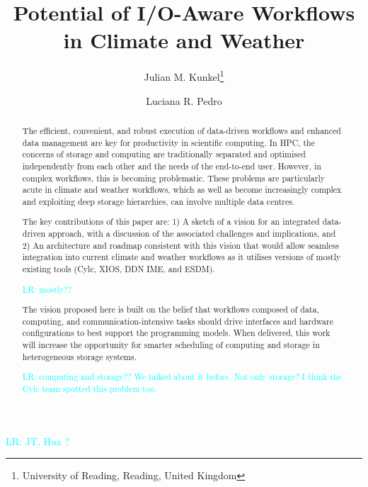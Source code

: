 \documentclass{superfri}
\newcommand{\lr}[1]{\textcolor{cyan}{LR: #1}}
\begin{document}
\author{Julian M. Kunkel\footnote{\label{uread}University of Reading, Reading, United Kingdom} \and Luciana R. Pedro
}

\lr{JT, Hua ?}

\title{Potential of I/O-Aware Workflows in Climate and Weather}

\maketitle{}

\begin{abstract}
The efficient, convenient, and robust execution of data-driven workflows and enhanced data management are key for productivity in scientific computing.
In HPC, the concerns of storage and computing are traditionally separated and optimised independently from each other and the needs of the end-to-end user. However, in complex workflows, this is becoming problematic. These problems are particularly acute in climate and weather workflows, which as well as become increasingly complex and exploiting deep storage hierarchies, can involve multiple data centres.

The key contributions of this paper are:
1) A sketch of a vision for an integrated data-driven approach, with a discussion of the associated challenges and implications, and 2) An architecture and roadmap consistent with this vision that would allow seamless integration into current climate and weather workflows as it utilises versions of mostly existing tools (Cylc, XIOS, DDN IME, and ESDM).

\lr{mostly??}

The vision proposed here is built on the belief that workflows composed of data, computing, and communication-intensive tasks should drive interfaces and hardware configurations to best support the programming models.
When delivered, this work will increase the opportunity for smarter scheduling of computing and storage in heterogeneous storage systems.

\lr{computing and storage?? We talked about it before. Not only storage? I think the Cylc team spotted this problem too.}

\end{abstract}

\end{document}
